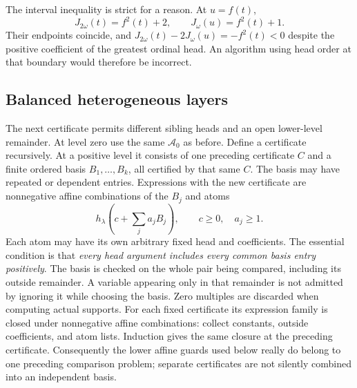 The interval inequality is strict for a reason. At $u=f(t)$,
\[
 J_{2\omega}(t)=f^2(t)+2,\qquad
 J_\omega(u)=f^2(t)+1.
\]
Their endpoints coincide, and
$J_{2\omega}(t)-2J_\omega(u)=-f^2(t)<0$ despite the positive coefficient
of the greatest ordinal head. An algorithm using head order at that
boundary would therefore be incorrect.

\subsection{Balanced heterogeneous layers}
The next certificate permits different sibling heads and an open lower-level
remainder. At level zero use the same $\mathcal A_0$ as before.  Define a
certificate recursively.  At a positive level it consists of one
preceding certificate $C$ and a finite ordered basis
$B_1,\ldots,B_k$, all certified by that same $C$.  The basis may have
repeated or dependent entries.  Expressions with the new certificate
are nonnegative affine combinations of the $B_j$ and atoms
\begin{equation}\label{m:eq:balanced-atoms}
 h_\lambda\!\left(c+\sum_j a_jB_j\right),
       \qquad c\ge0,\quad a_j\ge1.
\end{equation}
Each atom may have its own arbitrary fixed head and coefficients. The
essential condition is that \emph{every head argument includes every
common basis entry positively}. The basis is checked on the whole pair
being compared, including its outside remainder. A variable appearing
only in that remainder is not admitted by ignoring it while choosing the
basis. Zero multiples are discarded when computing actual supports.
For each fixed certificate its expression family is closed under
nonnegative affine combinations: collect constants, outside coefficients,
and atom lists.  Induction gives the same closure at the preceding
certificate.  Consequently the lower affine guards used below really do
belong to one preceding comparison problem; separate certificates are
not silently combined into an independent basis.

